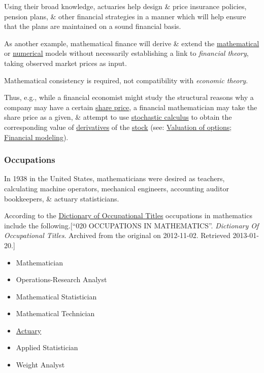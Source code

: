 \documentclass{article}
\begin{document}
Using their broad knowledge, actuaries help design \& price insurance policies, pension plans, \& other financial strategies in a manner which will help ensure that the plans are maintained on a sound financial basis.

%
As another example, mathematical finance will derive \& extend the \href{https://en.wikipedia.org/wiki/Mathematical_model}{mathematical} or \href{https://en.wikipedia.org/wiki/Numerical_analysis}{numerical} models without necessarily establishing a link to \textit{financial theory}, taking observed market prices as input.

Mathematical consistency is required, not compatibility with \textit{economic theory}.

Thus, e.g., while a financial economist might study the structural reasons why a company may have a certain \href{https://en.wikipedia.org/wiki/Share_price}{share price}, a financial mathematician may take the share price as a given, \& attempt to use \href{https://en.wikipedia.org/wiki/Stochastic_calculus}{stochastic calculus} to obtain the corresponding value of \href{https://en.wikipedia.org/wiki/Derivative_(finance)}{derivatives} of the \href{https://en.wikipedia.org/wiki/Stock}{stock} (see: \href{https://en.wikipedia.org/wiki/Valuation_of_options}{Valuation of options}; \href{https://en.wikipedia.org/wiki/Financial_modeling#Quantitative_finance}{Financial modeling}).

\subsubsection{Occupations}
\textsf{In 1938 in the United States, mathematicians were desired as teachers, calculating machine operators, mechanical engineers, accounting auditor bookkeepers, \& actuary statisticians.}

According to the \href{https://en.wikipedia.org/wiki/Dictionary_of_Occupational_Titles}{Dictionary of Occupational Titles} occupations in mathematics include the following.[``020 OCCUPATIONS IN MATHEMATICS''. \textit{Dictionary Of Occupational Titles}. Archived from the original on 2012-11-02. Retrieved 2013-01-20.]
\begin{itemize}
	\item Mathematician
	\item Operations-Research Analyst
	\item Mathematical Statistician
	\item Mathematical Technician
	\item \href{https://en.wikipedia.org/wiki/Actuary}{Actuary}
	\item Applied Statistician
	\item Weight Analyst
\end{itemize}
\end{document}
